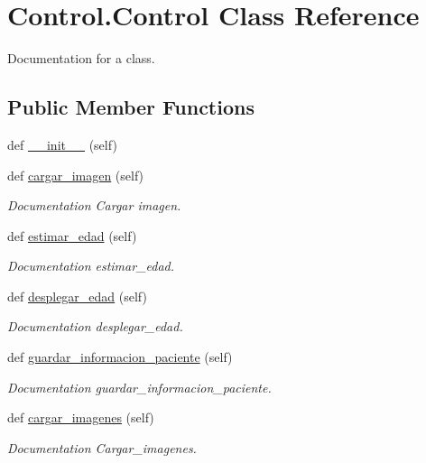 \hypertarget{class_control_1_1_control}{}\section{Control.\+Control Class Reference}
\label{class_control_1_1_control}


Documentation for a class.  


\subsection*{Public Member Functions}
\begin{DoxyCompactItemize}
\item 
def \mbox{\hyperlink{class_control_1_1_control_acbf9737a141c25fda2909c24f68cb75e}{\+\_\+\+\_\+init\+\_\+\+\_\+}} (self)
\item 
def \mbox{\hyperlink{class_control_1_1_control_ab893f9803dde0fb16e273b4c718352b7}{cargar\+\_\+imagen}} (self)
\begin{DoxyCompactList}\small\item\em Documentation Cargar imagen. \end{DoxyCompactList}\item 
def \mbox{\hyperlink{class_control_1_1_control_a214b0abae8fa56b8a6e4dae3cd053e7d}{estimar\+\_\+edad}} (self)
\begin{DoxyCompactList}\small\item\em Documentation estimar\+\_\+edad. \end{DoxyCompactList}\item 
def \mbox{\hyperlink{class_control_1_1_control_a5c05a607e82b93298524f090feaa2397}{desplegar\+\_\+edad}} (self)
\begin{DoxyCompactList}\small\item\em Documentation desplegar\+\_\+edad. \end{DoxyCompactList}\item 
def \mbox{\hyperlink{class_control_1_1_control_a0dc2a9739a717d5ff1163b803ddb8b26}{guardar\+\_\+informacion\+\_\+paciente}} (self)
\begin{DoxyCompactList}\small\item\em Documentation guardar\+\_\+informacion\+\_\+paciente. \end{DoxyCompactList}\item 
def \mbox{\hyperlink{class_control_1_1_control_a75e5202cfb3776a4d9d88ff00db4518a}{cargar\+\_\+imagenes}} (self)
\begin{DoxyCompactList}\small\item\em Documentation Cargar\+\_\+imagenes. \end{DoxyCompactList}\item 

\end{DoxyCompactItemize}
